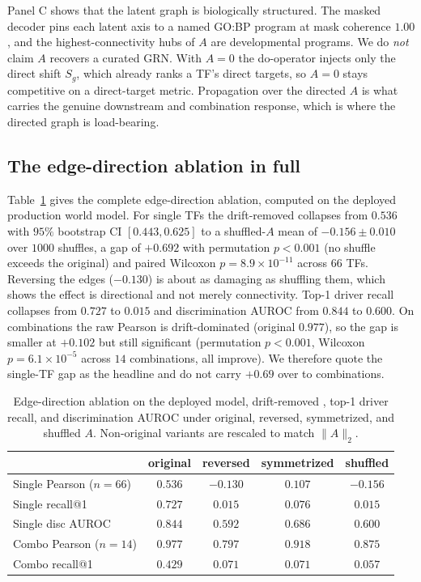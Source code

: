 Panel C shows that the latent graph is biologically structured. The masked decoder pins each
latent axis to a named GO:BP program at mask coherence $1.00$, and the highest-connectivity
hubs of $A$ are developmental programs. We do \emph{not} claim $A$ recovers a curated GRN.
With $A{=}0$ the do-operator injects only the direct shift $S_g$, which already ranks a TF's
direct targets, so $A{=}0$ stays competitive on a direct-target metric. Propagation over the
directed $A$ is what carries the genuine downstream and combination response, which is where
the directed graph is load-bearing.

\subsection{The edge-direction ablation in full}
Table~\ref{tab:edge} gives the complete edge-direction ablation, computed on the deployed
production world model. For single TFs the drift-removed \PearsonDEG collapses
from $0.536$ with $95\%$ bootstrap CI $[0.443,0.625]$ to a shuffled-$A$ mean of
$-0.156\pm0.010$ over $1000$ shuffles, a gap of $+0.692$ with permutation $p<0.001$ (no
shuffle exceeds the original) and paired Wilcoxon $p=8.9\times10^{-11}$ across $66$ TFs.
Reversing the edges ($-0.130$) is about as damaging as shuffling them, which shows the
effect is directional and not merely connectivity. Top-1 driver recall collapses from
$0.727$ to $0.015$ and discrimination AUROC from $0.844$ to $0.600$. On combinations the raw
Pearson is drift-dominated (original $0.977$), so the gap is smaller at $+0.102$ but still
significant (permutation $p<0.001$, Wilcoxon $p=6.1\times10^{-5}$ across $14$ combinations,
all improve). We therefore quote the single-TF gap as the headline and do not carry $+0.69$
over to combinations.

\begin{table}[h]\centering\footnotesize
\caption{Edge-direction ablation on the deployed model, drift-removed \PearsonDEG,
top-1 driver recall, and discrimination AUROC under original, reversed, symmetrized, and
shuffled $A$. Non-original variants are rescaled to match $\lVert A\rVert_2$.}
\label{tab:edge}
\begin{tabular}{@{}lcccc@{}}
\toprule
 & original & reversed & symmetrized & shuffled \\
\midrule
Single Pearson ($n{=}66$)   & $0.536$ & $-0.130$ & $0.107$ & $-0.156$ \\
Single recall@1             & $0.727$ & $0.015$  & $0.076$ & $0.015$ \\
Single disc AUROC           & $0.844$ & $0.592$  & $0.686$ & $0.600$ \\
Combo Pearson ($n{=}14$)    & $0.977$ & $0.797$  & $0.918$ & $0.875$ \\
Combo recall@1              & $0.429$ & $0.071$  & $0.071$ & $0.057$ \\
\bottomrule
\end{tabular}
\end{table}

